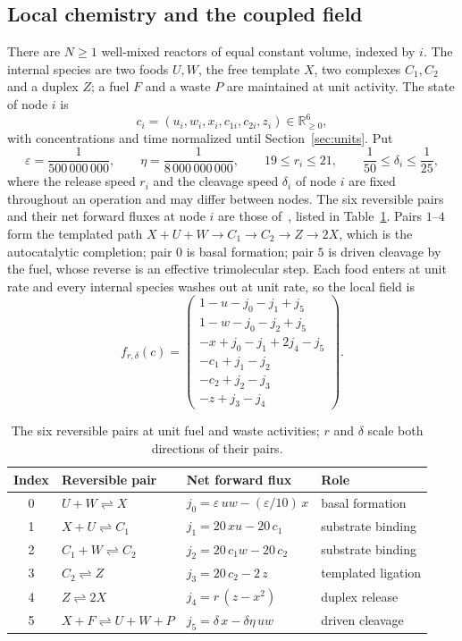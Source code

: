 \documentclass[11pt,a4paper]{article}
\theoremstyle{plain}
\theoremstyle{definition}
\theoremstyle{remark}
\newcommand{\R}{\mathbb R}
\newcommand{\eps}{\varepsilon}
\begin{document}
\subsection{Local chemistry and the coupled field}\label{sec:chemistry}
There are $N\ge1$ well-mixed reactors of equal constant volume, indexed by $i$. The internal species are two foods $U,W$, the free template $X$, two complexes $C_1,C_2$ and a duplex $Z$; a fuel $F$ and a waste $P$ are maintained at unit activity. The state of node $i$ is
\[
c_i=(u_i,w_i,x_i,c_{1i},c_{2i},z_i)\in\R^6_{\ge0},
\]
with concentrations and time normalized until Section~\ref{sec:units}. Put
\begin{equation}\label{eq:parameters}
\eps=\frac1{500\,000\,000},\qquad \eta=\frac1{8\,000\,000\,000},\qquad
19\le r_i\le21,\qquad \frac1{50}\le\delta_i\le\frac1{25},
\end{equation}
where the release speed $r_i$ and the cleavage speed $\delta_i$ of node $i$ are fixed throughout an operation and may differ between nodes. The six reversible pairs and their net forward fluxes at node $i$ are those of~\citep{recovery2026}, listed in Table~\ref{tab:pairs}. Pairs $1$--$4$ form the templated path $X+U+W\to C_1\to C_2\to Z\to2X$, which is the autocatalytic completion; pair $0$ is basal formation; pair $5$ is driven cleavage by the fuel, whose reverse is an effective trimolecular step. Each food enters at unit rate and every internal species washes out at unit rate, so the local field is
\begin{equation}\label{eq:field}
f_{r,\delta}(c)=\begin{pmatrix}
1-u-j_0-j_1+j_5\\1-w-j_0-j_2+j_5\\-x+j_0-j_1+2j_4-j_5\\
-c_1+j_1-j_2\\-c_2+j_2-j_3\\-z+j_3-j_4
\end{pmatrix}.
\end{equation}

\begin{table}[tb]
\centering\small
\begin{tabular}{clll}
\toprule
Index & Reversible pair & Net forward flux & Role\\
\midrule
0 & $U+W\rightleftharpoons X$ & $j_0=\eps\,uw-(\eps/10)\,x$ & basal formation\\
1 & $X+U\rightleftharpoons C_1$ & $j_1=20\,xu-20\,c_1$ & substrate binding\\
2 & $C_1+W\rightleftharpoons C_2$ & $j_2=20\,c_1w-20\,c_2$ & substrate binding\\
3 & $C_2\rightleftharpoons Z$ & $j_3=20\,c_2-2\,z$ & templated ligation\\
4 & $Z\rightleftharpoons 2X$ & $j_4=r\,(z-x^2)$ & duplex release\\
5 & $X+F\rightleftharpoons U+W+P$ & $j_5=\delta\,x-\delta\eta\,uw$ & driven cleavage\\
\bottomrule
\end{tabular}
\caption{The six reversible pairs at unit fuel and waste activities; $r$ and $\delta$ scale both directions of their pairs.}
\label{tab:pairs}
\end{table}
\end{document}
